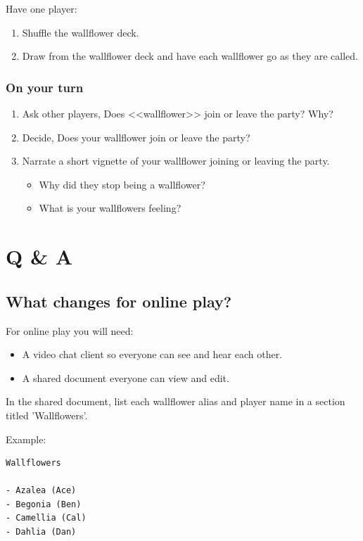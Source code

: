 \documentclass[letterpaper, 12pt]{article}
\newcommand{\cquestion}[1]{\subsection{#1}}
\begin{document}
{Have one player:

\begin{enumerate}
	\item Shuffle the wallflower deck.
	\item Draw from the wallflower deck and have each wallflower go as they are called.
\end{enumerate}

\subsubsection{On your turn}

\begin{enumerate}
	\item Ask other players, Does <<wallflower>>  join or leave the party? Why?
	\item Decide, Does your wallflower join or leave the party?
	\item Narrate a short vignette of your wallflower joining or leaving the party. 
	\begin{itemize}
		\item Why did they stop being a wallflower?
		\item What is your wallflowers feeling?
	\end{itemize}

	
\end{enumerate}


\pagebreak
\section{Q \& A}



\cquestion{What changes for online play?}

For online play you will need:

\begin{itemize}
	\item A video chat client so everyone can see and hear each other.
	\item A shared document everyone can view and edit.
\end{itemize}


In the shared document, list each wallflower alias and player name in a section titled 'Wallflowers'.

Example:

\begin{verbatim}
Wallflowers

- Azalea (Ace)
- Begonia (Ben)
- Camellia (Cal)
- Dahlia (Dan)
\end{verbatim}


}
\end{document}
